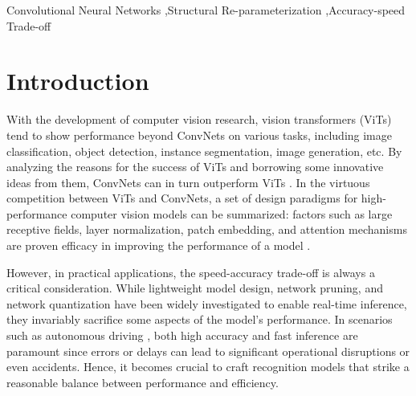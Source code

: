 \documentclass[preprint,12pt]{elsarticle}
\begin{document}
\begin{frontmatter}
\begin{keyword}
Convolutional Neural Networks \sep Structural Re-parameterization \sep Accuracy-speed Trade-off


\end{keyword}

\end{frontmatter}



\section{Introduction}
\label{sec:introduction}
With the development of computer vision research, vision transformers (ViTs) tend to show performance beyond ConvNets on various tasks, including image classification, object detection, instance segmentation, image generation, etc. By analyzing the reasons for the success of ViTs and borrowing some innovative ideas from them, ConvNets can in turn outperform ViTs \cite{replknet,convnext}. In the virtuous competition between ViTs and ConvNets, a set of design paradigms for high-performance computer vision models can be summarized: factors such as large receptive fields, layer normalization, patch embedding, and attention mechanisms are proven efficacy in improving the performance of a model \cite{replknet}.

However, in practical applications, the speed-accuracy trade-off is always a critical consideration. While lightweight model design, network pruning, and network quantization have been widely investigated to enable real-time inference, they invariably sacrifice some aspects of the model's performance. In scenarios such as autonomous driving \cite{autodriving}, both high accuracy and fast inference are paramount since errors or delays can lead to significant operational disruptions or even accidents. Hence, it becomes crucial to craft recognition models that strike a reasonable balance between performance and efficiency.
\end{document}
